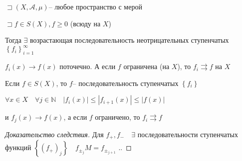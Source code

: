 \documentclass{book}
\newcommand\N{\ensuremath{\mathbb{N}}}
\theoremstyle{definition}
\begin{document}
\begin{theorem}

    $\sqsupset \left( X, \mathcal A, \mu \right) $-- любое пространство с мерой

    $\sqsupset f\in S(X), f \geqslant 0$ (всюду на $X$)

    Тогда  $\exists $ возрастающая последовательность неотрицательных ступенчатых $\left\{ f_i \right\} _{i=1}^{\infty }$ 

    $f_i(x) \to f(x)$ поточечно. А если $f$ ограничена (на $X$), то  $f_i \rightrightarrows f$ на  $X$
\end{theorem}
\begin{corollary}
    Если $f\in S(X)$, то  $f$-- последовательность ступенчатых  $\left\{ f_i \right\} $

    $\forall x\in X\quad \forall j\in \N \quad \left| f_i(x) \right| \leqslant \left| f_{i+1}(x) \right| \leqslant \left| f(x) \right| $

    и $f_j(x) \to f(x)$, а если $f$ ограничено, то  $f_i \rightrightarrows f$
\end{corollary}
\begin{proof}
    [Доказательство следствия]

    Для $f_+, f_-\quad \exists $ последовательности ступенчатых функций $\left\{ \left( f_+ \right)_j \right\} \quad f_{\pm_j}M=f_{\pm_{j +1}}$
    ..
\end{proof}
\end{document}
